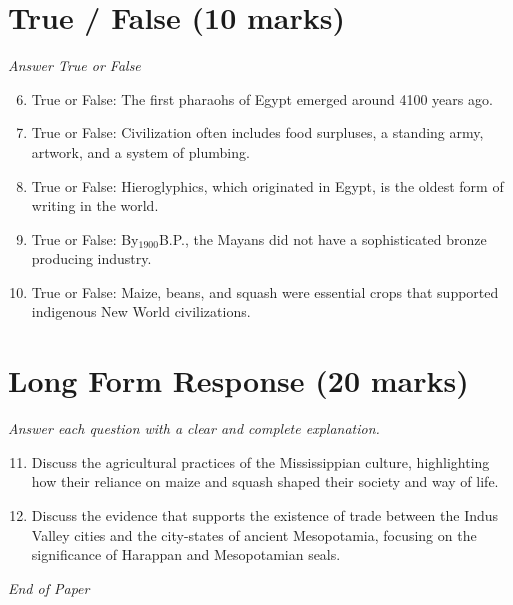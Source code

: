 \documentclass[12pt]{article}
\begin{document}
\section*{True / False (10 marks)}
\textit{Answer True or False}
\begin{enumerate}[label=\arabic*.]
\setcounter{enumi}{5}
\item True or False: The first pharaohs of Egypt emerged around 4100 years ago.
\item True or False: Civilization often includes food surpluses, a standing army, artwork, and a system of plumbing.
\item True or False: Hieroglyphics, which originated in Egypt, is the oldest form of writing in the world.
\item True or False: By$_{1900}$B.P., the Mayans did not have a sophisticated bronze producing industry.
\item True or False: Maize, beans, and squash were essential crops that supported indigenous New World civilizations.
\end{enumerate}

\section*{Long Form Response (20 marks)}
\textit{Answer each question with a clear and complete explanation.}
\begin{enumerate}[label=\arabic*.]
\setcounter{enumi}{10}
\item Discuss the agricultural practices of the Mississippian culture, highlighting how their reliance on maize and squash shaped their society and way of life.
\item Discuss the evidence that supports the existence of trade between the Indus Valley cities and the city-states of ancient Mesopotamia, focusing on the significance of Harappan and Mesopotamian seals.
\end{enumerate}

\vfill
\noindent\textit{End of Paper}
\end{document}
